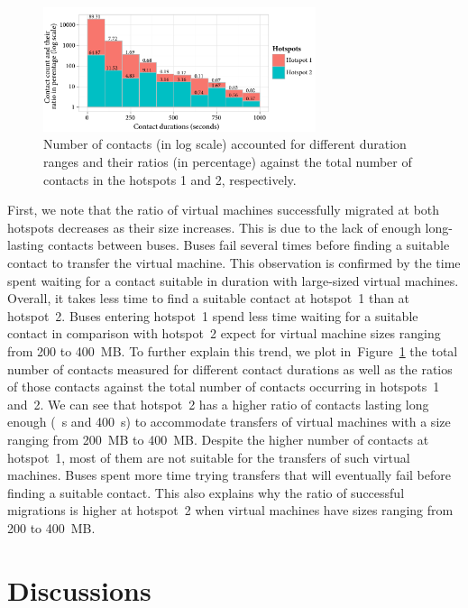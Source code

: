 \begin{figure}
    \vspace{-10pt}
    \centering
    \includegraphics[width=8cm]{figures/contact-durations-histogram.pdf}
    \caption{Number of contacts (in log scale) accounted for different duration ranges and their ratios (in percentage) against the total number of contacts in the hotspots 1 and 2, respectively.}
    \label{fig:plot-contact-duration-ratio}
\end{figure}
First, we note that the ratio of virtual machines successfully migrated at both hotspots decreases as their size increases. This is due to the lack of enough long-lasting contacts between buses. Buses fail several times before finding a suitable contact to transfer the virtual machine. This observation is confirmed by the time spent waiting for a contact suitable in duration with large-sized virtual machines. Overall, it takes less time to find a suitable contact at hotspot~1 than at hotspot~2. Buses entering hotspot~1 spend less time waiting for a suitable contact in comparison with hotspot~2 expect for virtual machine sizes ranging from 200 to 400~MB. To further explain this trend, we plot in~Figure~\ref{fig:plot-contact-duration-ratio} the total number of contacts measured for different contact durations as well as the ratios of those contacts against the total number of contacts occurring in  hotspots~1 and~2. We can see that hotspot~2 has a higher ratio of contacts lasting long enough (~s and 400~s) to accommodate transfers of virtual machines with a size ranging from 200~MB to 400~MB. Despite the higher number of contacts at hotspot~1, most of them are not suitable for the transfers of such virtual machines. Buses spent more time trying transfers that will eventually fail before finding a suitable contact. This also explains why the ratio of successful migrations is higher at hotspot~2 when virtual machines have sizes ranging from 200 to 400~MB.


\section{Discussions}

